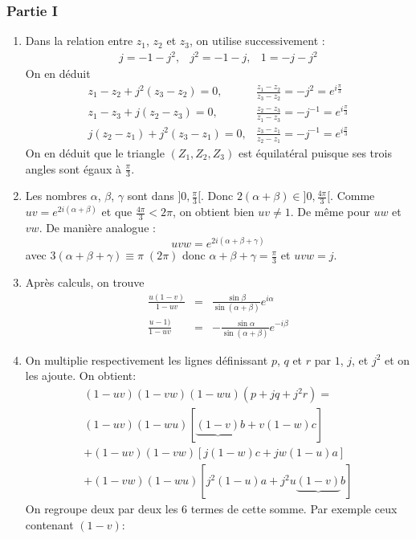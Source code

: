 \subsubsection*{Partie I}
\begin{enumerate}
\item Dans la relation entre $z_1$, $z_2$ et $z_3$, on utilise successivement :
\begin{eqnarray*}
j=-1-j^2 ,& j^2=-1-j ,& 1=-j-j^2
\end{eqnarray*}
On en déduit 
\begin{eqnarray*}
z_1-z_2+j^2(z_3-z_2)=0 ,& \frac{z_1-z_2}{z_3-z_2}=-j^2=e^{i\frac{\pi}{3}}\\
z_1-z_3+j(z_2-z_3)=0 ,& \frac{z_2-z_3}{z_1-z_3}=-j^{-1}=e^{i\frac{\pi}{3}}\\
j(z_2-z_1)+j^2(z_3-z_1)=0 ,& \frac{z_3-z_1}{z_2-z_1}=-j^{-1}=e^{i\frac{\pi}{3}}
\end{eqnarray*}
On en déduit que le triangle $(Z_1,Z_2,Z_3)$ est équilatéral puisque ses trois angles sont égaux à $\frac{\pi}{3}$.
\item Les nombres $\alpha$, $\beta$, $\gamma$ sont dans $]0,\frac{\pi}{3}[$. Donc $2(\alpha+\beta)\in ]0,\frac{4\pi}{3}[$. Comme $uv=e^{2i(\alpha+\beta)}$ et que $\frac{4\pi}{3}<2\pi$, on obtient bien $uv\neq1$. De même pour $uw$ et $vw$.\newline
De manière analogue :
\[uvw=e^{2i(\alpha+\beta+\gamma)}\]
avec $3(\alpha+\beta+\gamma)\equiv \pi \; (2\pi)$ donc $\alpha+\beta+\gamma=\frac{\pi}{3}$ et $uvw=j$.
\item Après calculs, on trouve
\begin{eqnarray*}
\frac{u(1-v)}{1-uv} &=& \frac{\sin \beta}{\sin(\alpha +\beta)}e^{i\alpha}\\
\frac{u-1)}{1-uv} &=& -\frac{\sin \alpha}{\sin(\alpha +\beta)}e^{-i\beta}
\end{eqnarray*}
\item On multiplie respectivement les lignes définissant $p$, $q$ et $r$ par $1$, $j$, et $j^2$ et on les ajoute. On obtient:
\begin{eqnarray*}
(1-uv)(1-vw)(1-wu)(p+jq+j^2r) =\\
(1-uv)(1-wu)\left[ \underbrace{(1-v)}_{}b +v(1-w)c\right]\\
+(1-uv)(1-vw)\left[ j(1-w)c + jw(1-u)a\right]\\
+(1-vw)(1-wu)\left[ j^2(1-u)a + j^2u\underbrace{(1-v)}_{}b\right]
\end{eqnarray*}
On regroupe deux par deux les 6 termes de cette somme. Par exemple ceux contenant $(1-v)$:

\end{enumerate}
